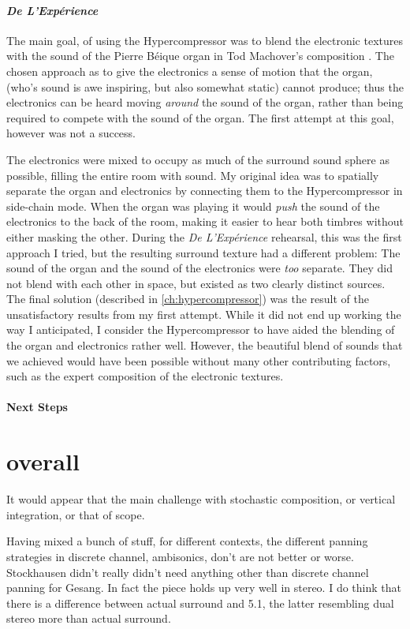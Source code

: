 \paragraph{\textit{De L'Exp\'{e}rience}}
The main goal, of using the Hypercompressor was to blend the
electronic textures with the sound of the Pierre B\'{e}ique organ in
Tod Machover's composition . The chosen approach as to give the
electronics a sense of motion that the organ, (who's sound is awe
inspiring, but also somewhat static) cannot produce; thus the
electronics can be heard moving \emph{around} the sound of the organ,
rather than being required to compete with the sound of the organ.
The first attempt at this goal, however was not a success.

The electronics were mixed to occupy as much of the surround sound
sphere as possible, filling the entire room with sound.  My original
idea was to spatially separate the organ and electronics by connecting
them to the Hypercompressor in side-chain mode.  When the organ was
playing it would \emph{push} the sound of the electronics to the back
of the room, making it easier to hear both timbres without either
masking the other.  During the \textit{De L'Exp\'{e}rience} rehearsal,
this was the first approach I tried, but the resulting surround
texture had a different problem: The sound of the organ and the sound
of the electronics were \emph{too} separate. They did not blend with
each other in space, but existed as two clearly distinct sources. The
final solution (described in \autoref{ch:hypercompressor}) was the
result of the unsatisfactory results from my first attempt. While it
did not end up working the way I anticipated, I consider the
Hypercompressor to have aided the blending of the organ and
electronics rather well. However, the beautiful blend of sounds that
we achieved would have been possible without many other contributing
factors, such as the expert composition of the electronic textures.
\paragraph{Next Steps}

\section{overall}
It would appear that the main challenge with stochastic composition,
or vertical integration, or that of scope. 

Having mixed a bunch of stuff, for different contexts, the different
panning strategies in discrete channel, ambisonics, don't are not
better or worse. Stockhausen didn't really didn't need anything other than
discrete channel panning for Gesang. In fact the piece holds up very
well in stereo. I do think that there is a difference between actual
surround and 5.1, the latter resembling dual stereo more than actual
surround. 


